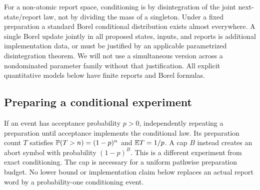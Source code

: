For a non-atomic report space, conditioning is by disintegration of the
joint next-state/report law, not by dividing the mass of a singleton. Under
a fixed preparation a standard Borel conditional distribution exists almost
everywhere. A single Borel update jointly in all proposed states, inputs,
and reports is additional implementation data, or must be justified by an
applicable parametrized disintegration theorem. We will not use a
simultaneous version across a nondominated parameter family without that
justification. All explicit quantitative models below have finite reports
and Borel formulas.

\subsection{Preparing a conditional experiment}
If an event has acceptance probability $p>0$, independently repeating a
preparation until acceptance implements the conditional law. Its preparation
count $T$ satisfies $\mathbb P(T>n)=(1-p)^n$ and $\mathbb E T=1/p$. A cap $B$ instead
creates an abort symbol with probability $(1-p)^B$. This is a different
experiment from exact conditioning. The cap is necessary for a uniform
pathwise preparation budget. No lower bound or implementation claim below
replaces an actual report word by a probability-one conditioning event.
